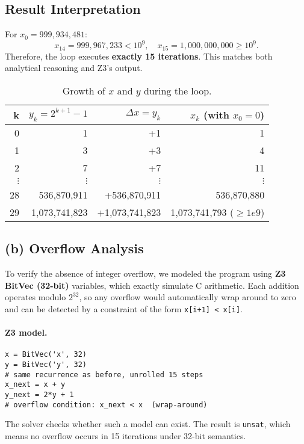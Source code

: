 \documentclass[a4paper,11pt]{article}
\begin{document}
\subsection*{Result Interpretation}

For \(x_0 = 999,934,481\):
\[
x_{14} = 999,967,233 < 10^9, \quad
x_{15} = 1,000,000,000 \ge 10^9.
\]
Therefore, the loop executes \textbf{exactly 15 iterations}.
This matches both analytical reasoning and Z3's output.




\begin{table}[h]
\centering
\begin{tabular}{r|r|r|r}
\textbf{k} & \(y_k = 2^{k+1}-1\) & \(\Delta x = y_k\) & \(x_k\) (with \(x_0=0\)) \\\hline
0 & 1 & +1 & 1 \\
1 & 3 & +3 & 4 \\
2 & 7 & +7 & 11 \\
$\vdots$ & $\vdots$ & $\vdots$ & $\vdots$ \\
28 & 536,870,911 & +536,870,911 & 536,870,880 \\
29 & 1,073,741,823 & +1,073,741,823 & 1,073,741,793 ($\ge 1e9$)
\end{tabular}
\caption{Growth of \(x\) and \(y\) during the loop.}
\end{table}



\subsection*{(b) Overflow Analysis}

To verify the absence of integer overflow, we modeled the program using
\textbf{Z3 BitVec (32-bit)} variables, which exactly simulate C arithmetic.
Each addition operates modulo $2^{32}$, so any overflow would automatically
wrap around to zero and can be detected by a constraint of the form
\texttt{x[i+1] < x[i]}.

\paragraph{Z3 model.}
\begin{verbatim}
x = BitVec('x', 32)
y = BitVec('y', 32)
# same recurrence as before, unrolled 15 steps
x_next = x + y
y_next = 2*y + 1
# overflow condition: x_next < x  (wrap-around)
\end{verbatim}

The solver checks whether such a model can exist. The result is \texttt{unsat},
which means no overflow occurs in 15 iterations under 32-bit semantics.
\end{document}
